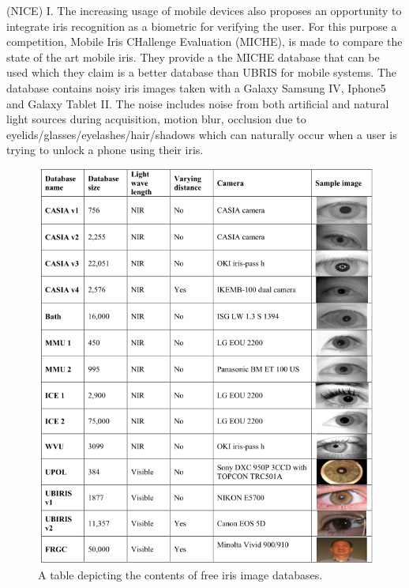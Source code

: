 (NICE) I. The increasing usage of mobile devices also proposes an opportunity to integrate iris recognition as a biometric for verifying the user.  For this purpose a competition, Mobile Iris CHallenge Evaluation (MICHE), is made to compare the state of the art mobile iris. They provide a the MICHE database that can be used which they claim is a better database than UBRIS for mobile systems. The database contains noisy iris images taken with a Galaxy Samsung IV, Iphone5 and Galaxy Tablet II. The noise includes noise from both artificial and natural light sources during acquisition, motion blur, occlusion due to eyelids/glasses/eyelashes/hair/shadows which can naturally occur when a user is trying to unlock a phone using their iris. 

\begin{figure}[h]
\centering
\includegraphics[width=\textwidth]{figures/Iris_Database_tabel_1.png} 
\caption{A table depicting the contents of free iris image databases.}
\label{fig:Iris_database_1}
\end{figure}

